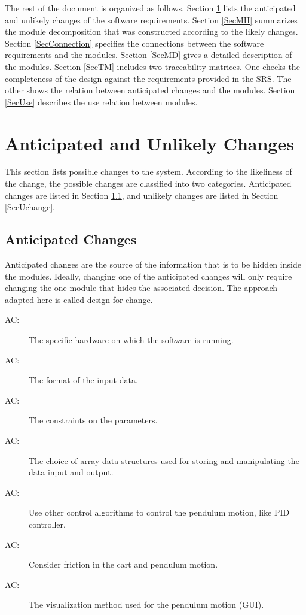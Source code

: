\documentclass[12pt, titlepage]{article}
\newcounter{acnum}
\newcommand{\actheacnum}{AC\theacnum}
\begin{document}
The rest of the document is organized as follows. Section
\ref{SecChange} lists the anticipated and unlikely changes of the software
requirements. Section \ref{SecMH} summarizes the module decomposition that
was constructed according to the likely changes. Section \ref{SecConnection}
specifies the connections between the software requirements and the
modules. Section \ref{SecMD} gives a detailed description of the
modules. Section \ref{SecTM} includes two traceability matrices. One checks
the completeness of the design against the requirements provided in the SRS. The
other shows the relation between anticipated changes and the modules. Section
\ref{SecUse} describes the use relation between modules.

\section{Anticipated and Unlikely Changes} \label{SecChange}

This section lists possible changes to the system. According to the likeliness
of the change, the possible changes are classified into two
categories. Anticipated changes are listed in Section \ref{SecAchange}, and
unlikely changes are listed in Section \ref{SecUchange}.

\subsection{Anticipated Changes} \label{SecAchange}

Anticipated changes are the source of the information that is to be hidden
inside the modules. Ideally, changing one of the anticipated changes will only
require changing the one module that hides the associated decision. The approach
adapted here is called design for
change.

\begin{description}
\item[ \actheacnum \label{acHardware}:] The specific
  hardware on which the software is running.
\item[ \actheacnum \label{acInputFormat}:] The format 
      of the input data.
\item[ \actheacnum \label{acConstraint}:] The constraints 
     on the parameters.
\item[ \actheacnum \label{acArrayDS}:] The choice of array 
     data structures used for storing and manipulating the data input and output.
\item[ \actheacnum \label{acControlAlgo}:] Use other control 
      algorithms to control the pendulum motion, like PID controller.
\item[ \actheacnum \label{acFriction}:] Consider friction 
      in the cart and pendulum motion.
\item[ \actheacnum \label{acGUI}:] The visualization method 
      used for the pendulum motion (GUI).
\end{description}
\end{document}
